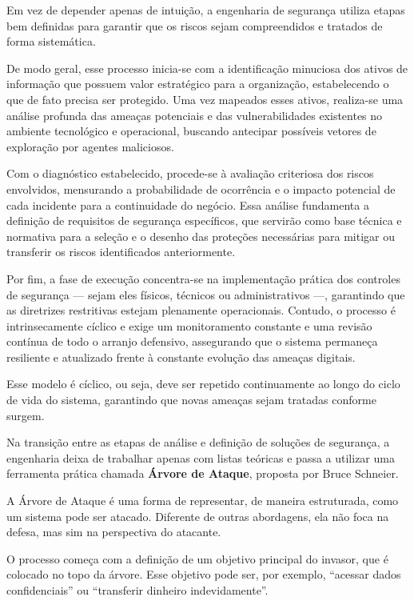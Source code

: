 \documentclass[12pt,a4paper,twoside]{report}
\begin{document}
Em vez de depender apenas de intuição, a engenharia de segurança utiliza etapas bem definidas para garantir que os riscos sejam compreendidos e tratados de forma sistemática.

De modo geral, esse processo inicia-se com a identificação minuciosa dos ativos de informação que possuem valor estratégico para a organização, estabelecendo o que de fato precisa ser protegido. Uma vez mapeados esses ativos, realiza-se uma análise profunda das ameaças potenciais e das vulnerabilidades existentes no ambiente tecnológico e operacional, buscando antecipar possíveis vetores de exploração por agentes maliciosos.

Com o diagnóstico estabelecido, procede-se à avaliação criteriosa dos riscos envolvidos, mensurando a probabilidade de ocorrência e o impacto potencial de cada incidente para a continuidade do negócio. Essa análise fundamenta a definição de requisitos de segurança específicos, que servirão como base técnica e normativa para a seleção e o desenho das proteções necessárias para mitigar ou transferir os riscos identificados anteriormente.

Por fim, a fase de execução concentra-se na implementação prática dos controles de segurança --- sejam eles físicos, técnicos ou administrativos ---, garantindo que as diretrizes restritivas estejam plenamente operacionais. Contudo, o processo é intrinsecamente cíclico e exige um monitoramento constante e uma revisão contínua de todo o arranjo defensivo, assegurando que o sistema permaneça resiliente e atualizado frente à constante evolução das ameaças digitais.

Esse modelo é cíclico, ou seja, deve ser repetido continuamente ao longo do ciclo de vida do sistema, garantindo que novas ameaças sejam tratadas conforme surgem.


Na transição entre as etapas de análise e definição de soluções de segurança, a engenharia deixa de trabalhar apenas com listas teóricas e passa a utilizar uma ferramenta prática chamada \textbf{Árvore de Ataque}, proposta por Bruce Schneier.

A Árvore de Ataque é uma forma de representar, de maneira estruturada, como um sistema pode ser atacado. Diferente de outras abordagens, ela não foca na defesa, mas sim na perspectiva do atacante.

O processo começa com a definição de um objetivo principal do invasor, que é colocado no topo da árvore. Esse objetivo pode ser, por exemplo, “acessar dados confidenciais” ou “transferir dinheiro indevidamente”.
\end{document}
